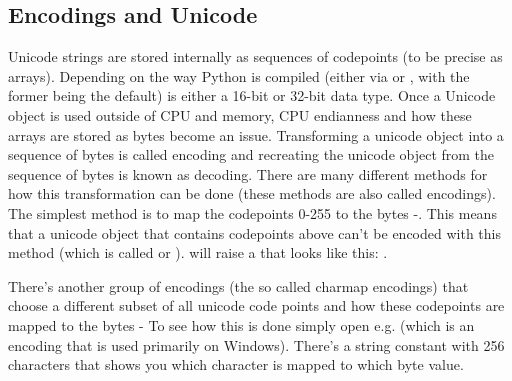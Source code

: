 \subsection{Encodings and Unicode\label{encodings-overview}}

Unicode strings are stored internally as sequences of codepoints (to
be precise as  arrays). Depending on the way Python is
compiled (either via  or 
, with the former being the default)
 is either a 16-bit or
32-bit data type. Once a Unicode object is used outside of CPU and
memory, CPU endianness and how these arrays are stored as bytes become
an issue. Transforming a unicode object into a sequence of bytes is
called encoding and recreating the unicode object from the sequence of
bytes is known as decoding. There are many different methods for how this
transformation can be done (these methods are also called encodings).
The simplest method is to map the codepoints 0-255 to the bytes
-. This means that a unicode object that contains 
codepoints above  can't be encoded with this method (which 
is called  or ).
 will raise a 
that looks like this: .

There's another group of encodings (the so called charmap encodings)
that choose a different subset of all unicode code points and how
these codepoints are mapped to the bytes -
To see how this is done simply open e.g. 
(which is an encoding that is used primarily on Windows).
There's a string constant with 256 characters that shows you which 
character is mapped to which byte value.

